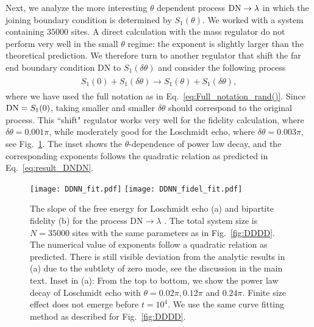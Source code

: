 Next, we analyze the more interesting $\theta$ dependent process ${\rm DN} \rightarrow \lambda$
in which the joining boundary condition is determined by $S_1(\theta)$. We worked with a system containing $35000$ sites. A direct calculation with the mass regulator do not perform very well in the small $\theta$ regime: the exponent is slightly larger than the theoretical prediction. We therefore turn to another regulator that shift the far end boundary condition DN to $S_1( \delta \theta )$ and consider the following process
\begin{eqnarray}\begin{aligned}
\label{eq:approx_DNDN}
S_1(0)+S_1(\delta\theta)\rightarrow S_1(\theta)+S_1(\delta\theta),
\end{aligned}\end{eqnarray}
where we have used the full notation as in Eq.~\eqref{eq:Full_notation_rand()}. Since ${\rm DN} = S_1 (0 )$, taking smaller and smaller $\delta \theta$ should correspond to the original process. This ``shift" regulator works very well for the fidelity calculation, where $\delta \theta = 0.001 \pi$, while moderately good for the Loschmidt echo, where $\delta \theta = 0.003\pi$, see Fig.~\ref{fig:DDNN}. The inset shows the $\theta$-dependence of power law decay, and the corresponding exponents follows the quadratic relation as predicted in Eq.~\eqref{eq:result_DNDN}. %

\begin{figure}
  \centering
\texttt{[image: DDNN\_fit.pdf]}
\texttt{[image: DDNN\_fidel\_fit.pdf]}
    \caption{The slope of the free energy for Loschmidt echo (a) and bipartite fidelity (b) for the process $\text{DN} \rightarrow \lambda$ {\iffalse in Eq.~\eqref{eq:DNDN}\fi}. The total system size is $N=35000$ sites with the same parameters as in Fig.~\ref{fig:DDDD}. The numerical value of exponents follow a quadratic relation as predicted. There is still visible deviation from the analytic results in (a) due to the subtlety of zero mode, see the discussion in the main text. Inset in (a): From the top to bottom, we show the power law decay of Loschmidt echo with $\theta=0.02\pi, 0.12\pi $ and $0.24\pi$. Finite size effect does not emerge before $t=10^{4}$. We use the same curve fitting method as described for Fig.~\ref{fig:DDDD}.}
      \label{fig:DDNN}
\end{figure}

